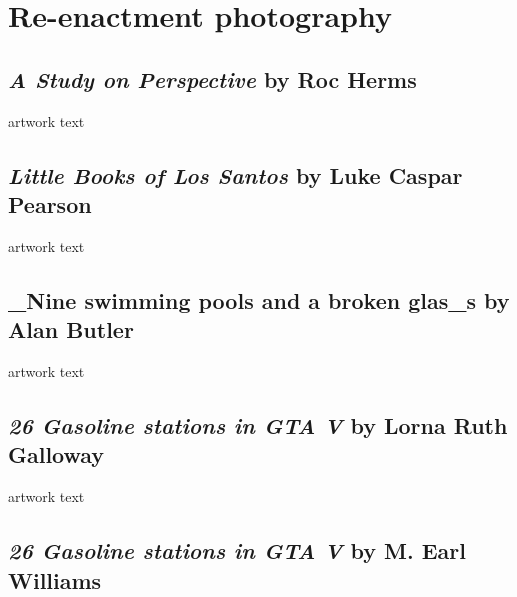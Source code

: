 \documentclass[
  openany]{book}
\begin{document}
\hypertarget{re-enactment-photography}{%
\chapter{Re-enactment photography}\label{re-enactment-photography}}

\hypertarget{a-study-on-perspective-by-roc-herms}{%
\section{\texorpdfstring{\emph{A Study on Perspective} by Roc Herms}{A Study on Perspective by Roc Herms}}\label{a-study-on-perspective-by-roc-herms}}

artwork text

\hypertarget{little-books-of-los-santos-by-luke-caspar-pearson}{%
\section{\texorpdfstring{\emph{Little Books of Los Santos} by Luke Caspar Pearson}{Little Books of Los Santos by Luke Caspar Pearson}}\label{little-books-of-los-santos-by-luke-caspar-pearson}}

artwork text

\hypertarget{nine-swimming-pools-and-a-broken-glas_s-by-alan-butler}{%
\section{\_Nine swimming pools and a broken glas\_s by Alan Butler}\label{nine-swimming-pools-and-a-broken-glas_s-by-alan-butler}}

artwork text

\hypertarget{gasoline-stations-in-gta-v-by-lorna-ruth-galloway}{%
\section{\texorpdfstring{\emph{26 Gasoline stations in GTA V} by Lorna Ruth Galloway}{26 Gasoline stations in GTA V by Lorna Ruth Galloway}}\label{gasoline-stations-in-gta-v-by-lorna-ruth-galloway}}

artwork text

\hypertarget{gasoline-stations-in-gta-v-by-m.-earl-williams}{%
\section{\texorpdfstring{\emph{26 Gasoline stations in GTA V} by M. Earl Williams}{26 Gasoline stations in GTA V by M. Earl Williams}}\label{gasoline-stations-in-gta-v-by-m.-earl-williams}}
\end{document}
